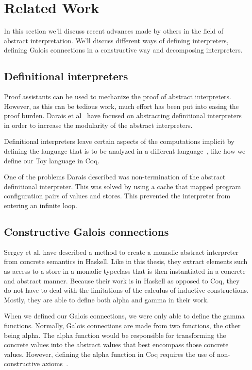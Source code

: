 \chapter{Related Work}
In this section we'll discuss recent advances made by others in the field of 
abstract interpretation. We'll discuss different ways of defining interpreters,
defining Galois connections in a constructive way and decomposing interpreters.

\section{Definitional interpreters}
Proof assistants can be used to mechanize the proof of abstract interpreters.
However, as this can be tedious work, much effort has been put into easing the
proof burden. Darais et al~\cite{darais2017abstracting} have focused on
abstracting definitional interpreters in order to increase the modularity of
the abstract interpreters. 

Definitional interpreters leave certain aspects of the computations implicit 
by defining the language that is to be analyzed in a different 
language~\cite{reynolds1972definitional}, like how we define our Toy language 
in Coq. 

One of the problems Darais described was non-termination of the abstract
definitional interpreter. This was solved by using a cache that mapped program
configuration pairs of values and stores. This prevented the interpreter from
entering an infinite loop.

\section{Constructive Galois connections}
Sergey et al.\cite{sergey2013monadic} have described a method to create a
monadic abstract interpreter
from concrete semantics in Haskell. Like in this thesis, they extract elements
such as access to a store in a monadic typeclass that is then instantiated in a
concrete and abstract manner. Because their work is in Haskell as opposed to
Coq, they do not have to deal with the limitations of the calculus of inductive
constructions. Mostly, they are able to define both alpha and gamma in their
work. 

When we defined our Galois connections, we were only able to define the gamma
functions. Normally, Galois connections are made from two functions, the
other being alpha. The alpha function would be responsible for transforming
the concrete values into the abstract values that best encompass those concrete
values. However, defining the alpha function in Coq requires the use of
non-constructive axioms~\cite{Monniaux3}.

